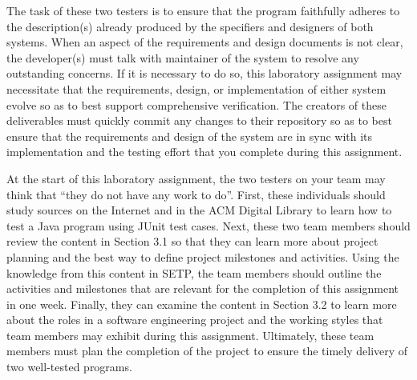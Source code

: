 The task of these two testers is to ensure that the program faithfully adheres to the description(s) already produced by
the specifiers and designers of both systems. When an aspect of the requirements and design documents is not clear, the
developer(s) must talk with maintainer of the system to resolve any outstanding concerns. If it is necessary to do so,
this laboratory assignment may necessitate that the requirements, design, or implementation of either system evolve so
as to best support comprehensive verification.  The creators of these deliverables must quickly commit any changes to
their repository so as to best ensure that the requirements and design of the system are in sync with its
implementation and the testing effort that you complete during this assignment.

At the start of this laboratory assignment, the two testers on your team may think that ``they do not have any work to
do''. First, these individuals should study sources on the Internet and in the ACM Digital Library to learn how to test
a Java program using JUnit test cases. Next, these two team members should review the content in Section 3.1 so that they
can learn more about project planning and the best way to define project milestones and activities. Using the knowledge
from this content in SETP, the team members should outline the activities and milestones that are relevant for the
completion of this assignment in one week. Finally, they can examine the content in Section 3.2 to learn more about the
roles in a software engineering project and the working styles that team members may exhibit during this assignment.
Ultimately, these team members must plan the completion of the project to ensure the timely delivery of two well-tested
programs.



